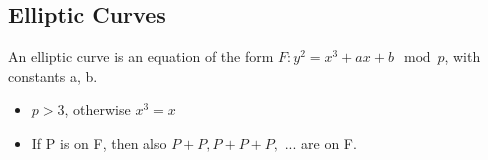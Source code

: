 



\subsection{Elliptic Curves}
\begin{defn}
    An elliptic curve is an equation of the form $F: y^2 = x^3 + ax + b \mod p$, with constants a, b.
    \begin{itemize}
        \item $p > 3$, otherwise $x^3 = x$
        \item If P is on F, then also $P + P, P+P+P,$ ... are on F.
    \end{itemize}
\end{defn}

